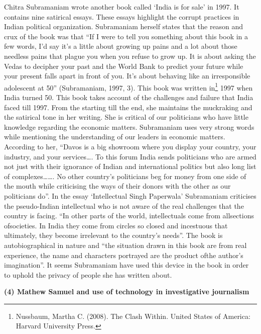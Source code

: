 \begin{multicols}{2}
\noi
Chitra Subramaniam wrote another book called ‘India is for sale’ in 1997. It contains nine
satirical essays. These essays highlight the corrupt practices in Indian political organization.
Subramaniam herself states that the reason and crux of the book was that “If I were to tell you
something about this book in a few words, I’d say it’s a little about growing up pains and a lot
about those needless pains that plague you when you refuse to grow up. It is about asking the
Vedas to decipher your past and the World Bank to predict your future while your present falls
apart in front of you. It’s about behaving like an irresponsible adolescent at 50” (Subramaniam,
1997, 3). This book was written in\footnote{Nussbaum, Martha C. (2008). The Clash Within. United States of America: Harvard University Press.} 1997 when India turned 50. This book takes account of
the challenges and failure that India faced till 1997. From the starting till the end, she maintains
the muckraking and the satirical tone in her writing. She is critical of our politicians who have
little knowledge regarding the economic matters. Subramaniam uses very strong words while mentioning the understanding of our leaders in economic matters. According to her, “Davos is
a big showroom where you display your country, your industry, and your services…. To this
forum India sends politicians who are armed not just with their ignorance of Indian and
international politics but also long list of complexes……. No other country’s politicians beg
for money from one side of the mouth while criticising the ways of their donors with the other
as our politicians do”. In the essay ‘Intellectual Singh Paperwala’ Subramaniam criticises the
pseudo-Indian intellectual who is not aware of the real challenges that the country is facing.
“In other parts of the world, intellectuals come from allsections ofsocieties. In India they come
from circles so closed and incestuous that ultimately, they become irrelevant to the country’s
needs”. The book is autobiographical in nature and “the situation drawn in this book are from
real experience, the name and characters portrayed are the product ofthe author’s imagination”.
It seems Subramaniam have used this device in the book in order to uphold the privacy of
people she has written about.


\noi
{\large \bfseries (4) Mathew Samuel and use of technology in investigative journalism}



\end{multicols}
